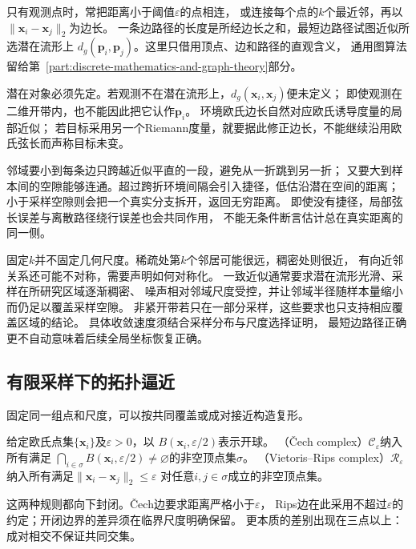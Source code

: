 只有观测点时，常把距离小于阈值$\varepsilon$的点相连，
或连接每个点的$k$个最近邻，再以$\lVert\bm x_i-\bm x_j\rVert_2$为边长。
一条边路径的长度是所经边长之和，最短边路径试图近似所选潜在流形上
$d_g(\bm p_i,\bm p_j)$。这里只借用顶点、边和路径的直观含义，
通用图算法留给第~\ref{part:discrete-mathematics-and-graph-theory}部分。

潜在对象必须先定。若观测不在潜在流形上，$d_g(\bm x_i,\bm x_j)$便未定义；
即使观测在二维开带内，也不能因此把它认作$\bm p_i$。
环境欧氏边长自然对应欧氏诱导度量的局部近似；
若目标采用另一个Riemann度量，就要据此修正边长，不能继续沿用欧氏弦长而声称目标未变。

邻域要小到每条边只跨越近似平直的一段，避免从一折跳到另一折；
又要大到样本间的空隙能够连通。超过跨折环境间隔会引入捷径，低估沿潜在空间的距离；
小于采样空隙则会把一个真实分支拆开，返回无穷距离。
即使没有捷径，局部弦长误差与离散路径绕行误差也会共同作用，
不能无条件断言估计总在真实距离的同一侧。

固定$k$并不固定几何尺度。稀疏处第$k$个邻居可能很远，稠密处则很近，
有向近邻关系还可能不对称，需要声明如何对称化。
一致近似通常要求潜在流形光滑、采样在所研究区域逐渐稠密、
噪声相对邻域尺度受控，并让邻域半径随样本量缩小而仍足以覆盖采样空隙。
非紧开带若只在一部分采样，这些要求也只支持相应覆盖区域的结论。
具体收敛速度须结合采样分布与尺度选择证明，
最短边路径正确更不自动意味着后续全局坐标恢复正确。

\subsection{有限采样下的拓扑逼近}
\label{sec:geometry-sampled-topology-approximation}

固定同一组点和尺度，可以按共同覆盖或成对接近构造复形。
\begin{definition}
\label{def:geometry-cech-rips-complexes}
给定欧氏点集$\{\bm x_i\}$及$\varepsilon>0$，以
$B(\bm x_i,\varepsilon/2)$表示开球。
（Čech complex）$\mathcal C_\varepsilon$纳入所有满足
$\bigcap_{i\in\sigma}B(\bm x_i,\varepsilon/2)\neq\varnothing$的非空顶点集$\sigma$。
（Vietoris--Rips complex）$\mathcal R_\varepsilon$
纳入所有满足$\lVert\bm x_i-\bm x_j\rVert_2\leq\varepsilon$
对任意$i,j\in\sigma$成立的非空顶点集。
\end{definition}
这两种规则都向下封闭。Čech边要求距离严格小于$\varepsilon$，
Rips边在此采用不超过$\varepsilon$的约定；开闭边界的差异须在临界尺度明确保留。
更本质的差别出现在三点以上：成对相交不保证共同交集。

